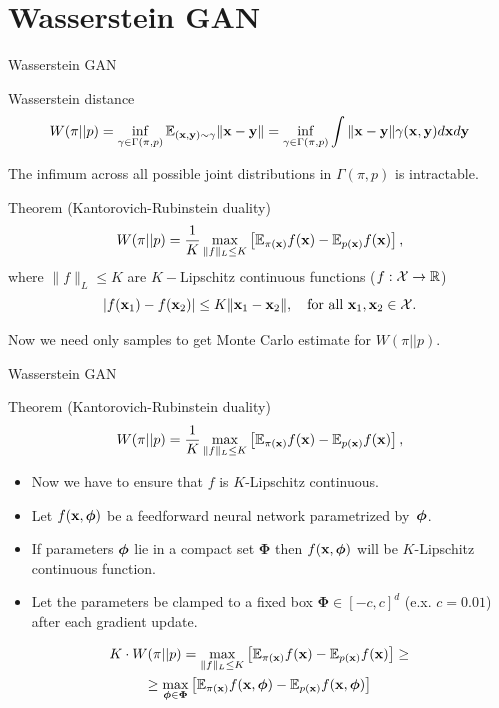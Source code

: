 \section{Wasserstein GAN}
\begin{frame}{Wasserstein GAN}
	\begin{block}{Wasserstein distance}
		\vspace{-0.5cm}
		\[
			W(\pi || p) = \inf_{\gamma \in \Gamma(\pi, p)} \mathbb{E}_{(\mathbf{x}, \mathbf{y}) \sim \gamma} \| \mathbf{x} - \mathbf{y} \| =  \inf_{\gamma \in \Gamma(\pi, p)} \int \| \mathbf{x} - \mathbf{y} \| \gamma (\mathbf{x}, \mathbf{y}) d \mathbf{x} d \mathbf{y}
		\]
		\vspace{-0.3cm}
	\end{block}
	The infimum across all possible joint distributions in $\Gamma(\pi, p)$ is intractable.
	\begin{block}{Theorem (Kantorovich-Rubinstein duality)}
		\vspace{-0.3cm}
		\[
			W(\pi || p) = \frac{1}{K} \max_{\| f \|_L \leq K} \left[ \mathbb{E}_{\pi(\mathbf{x})} f(\mathbf{x})  - \mathbb{E}_{p(\mathbf{x})} f(\mathbf{x})\right],
		\]
		where $\| f \|_L \leq K$ are $K-$Lipschitz continuous functions ($f: \mathcal{X} \rightarrow \mathbb{R}$)
		\vspace{-0.2cm}
		\[
			|f(\mathbf{x}_1) - f(\mathbf{x}_2)| \leq K \| \mathbf{x}_1 - \mathbf{x}_2 \|, \quad \text{for all } \mathbf{x}_1, \mathbf{x}_2 \in \mathcal{X}.
		\]
		\vspace{-0.5cm}
	\end{block}
	Now we need only samples to get Monte Carlo estimate for $W(\pi || p)$.

\end{frame}
\begin{frame}{Wasserstein GAN}
	\begin{block}{Theorem (Kantorovich-Rubinstein duality)}
		\[
		W(\pi || p) = \frac{1}{K} \max_{\| f \|_L \leq K} \left[ \mathbb{E}_{\pi(\mathbf{x})} f(\mathbf{x})  - \mathbb{E}_{p(\mathbf{x})} f(\mathbf{x})\right],
		\]
	\end{block}
	\begin{itemize}
		\item Now we have to ensure that $f$ is $K$-Lipschitz continuous.
		\item Let $f(\mathbf{x}, \boldsymbol{\phi})$ be a feedforward neural network parametrized by~$\boldsymbol{\phi}$.
		\item If parameters $\boldsymbol{\phi}$ lie in a compact set $\boldsymbol{\Phi}$ then $f(\mathbf{x}, \boldsymbol{\phi})$ will be $K$-Lipschitz continuous function. 
		\item Let the parameters be clamped to a fixed box $\boldsymbol{\Phi} \in [-c, c]^d$ (e.x. $c = 0.01$) after each gradient update.
	\end{itemize}
	\begin{multline*}
		K \cdot W(\pi || p) = \max_{\| f \|_L \leq K} \left[ \mathbb{E}_{\pi(\mathbf{x})} f(\mathbf{x})  - \mathbb{E}_{p(\mathbf{x})} f(\mathbf{x})\right] \geq \\  \geq \max_{\boldsymbol{\phi} \in \boldsymbol{\Phi}} \left[ \mathbb{E}_{\pi(\mathbf{x})} f(\mathbf{x}, \boldsymbol{\phi})  - \mathbb{E}_{p(\mathbf{x})} f(\mathbf{x}, \boldsymbol{\phi} )\right]
	\end{multline*}
	
\end{frame}
